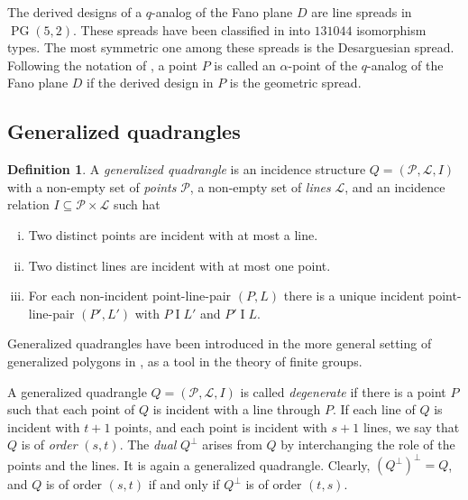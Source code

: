 \documentclass[a4paper,abstracton,12pt]{scrartcl}
\DeclareMathOperator{\PG}{PG}
\theoremstyle{definition}
\newtheorem{definition}[lemma]{Definition}
\theoremstyle{remark}
\begin{document}
The derived designs of a $q$-analog of the Fano plane $D$ are line spreads in $\PG(5,2)$.
These spreads have been classified in \cite{Mateva-Topalova-2009-JCD17[1]:90-102} into $131044$ isomorphism types.
The most symmetric one among these spreads is the Desarguesian spread.
Following the notation of \cite{Heden-Sissokho-2016-ArsComb124:161-164}, a point $P$ is called an \emph{$\alpha$}-point of the $q$-analog of the Fano plane $D$ if the derived design in $P$ is the geometric spread.

\subsection{Generalized quadrangles}
\label{subsect:gq}

\begin{definition}
A \emph{generalized quadrangle} is an incidence structure $Q = (\mathcal{P},\mathcal{L},I)$ with a non-empty set of \emph{points} $\mathcal{P}$, a non-empty set of \emph{lines} $\mathcal{L}$, and an incidence relation $I \subseteq \mathcal{P}\times\mathcal{L}$ such hat
\begin{enumerate}[(i)]
	\item Two distinct points are incident with at most a line.
	\item Two distinct lines are incident with at most one point.
	\item For each non-incident point-line-pair $(P,L)$ there is a unique incident point-line-pair $(P',L')$ with $P\mathrel{I} L'$ and $P' \mathrel{I} L$.
\end{enumerate}
\end{definition}
Generalized quadrangles have been introduced in the more general setting of generalized polygons in \cite{Tits-1959-InstHautesEtudesSciPublMath2:13-60}, as a tool in the theory of finite groups.


A generalized quadrangle $Q = (\mathcal{P},\mathcal{L},I)$ is called \emph{degenerate} if there is a point $P$ such that each point of $Q$ is incident with a line through $P$.
If each line of $Q$ is incident with $t+1$ points, and each point is incident with $s+1$ lines, we say that $Q$ is of \emph{order} $(s,t)$.
The \emph{dual} $Q^\perp$ arises from $Q$ by interchanging the role of the points and the lines.
It is again a generalized quadrangle.
Clearly, $(Q^\perp)^\perp = Q$, and $Q$ is of order $(s,t)$ if and only if $Q^\perp$ is of order $(t,s)$.
\end{document}

